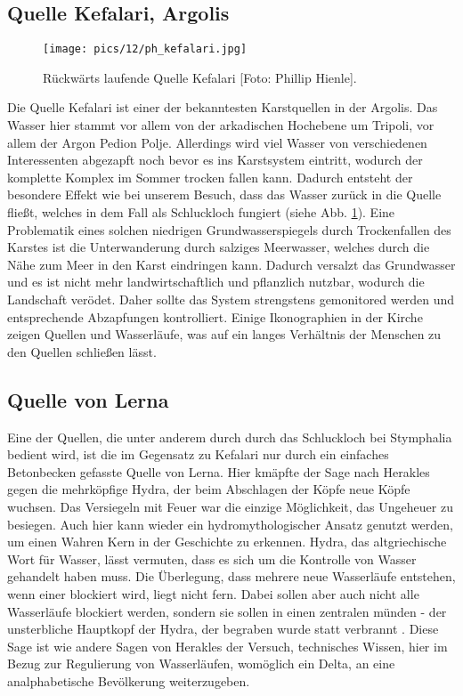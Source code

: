 \documentclass[preprint]{geomorphica} %
\begin{document}
\subsection{Quelle Kefalari, Argolis}

\begin{figure}[h]
    \centering
    \texttt{[image: pics/12/ph\_kefalari.jpg]}
    \caption{Rückwärts laufende Quelle Kefalari [Foto: Phillip Hienle].}
    \label{pic:kefalari}
\end{figure}

Die Quelle Kefalari ist einer der bekanntesten Karstquellen in der Argolis. Das Wasser hier stammt vor allem von der arkadischen Hochebene um Tripoli, vor allem der Argon Pedion Polje. Allerdings wird viel Wasser von verschiedenen Interessenten abgezapft noch bevor es ins Karstsystem eintritt, wodurch der komplette Komplex im Sommer trocken fallen kann. Dadurch entsteht der besondere Effekt wie bei unserem Besuch, dass das Wasser zurück in die Quelle fließt, welches in dem Fall als Schluckloch fungiert (siehe Abb. \ref{pic:kefalari}). Eine Problematik eines solchen niedrigen Grundwasserspiegels durch Trockenfallen des Karstes ist die Unterwanderung durch salziges Meerwasser, welches durch die Nähe zum Meer in den Karst eindringen kann. Dadurch versalzt das Grundwasser und es ist nicht mehr landwirtschaftlich und pflanzlich nutzbar, wodurch die Landschaft verödet. Daher sollte das System strengstens gemonitored werden und entsprechende Abzapfungen kontrolliert. Einige Ikonographien in der Kirche zeigen Quellen und Wasserläufe, was auf ein langes Verhältnis der Menschen zu den Quellen schließen lässt.

\subsection{Quelle von Lerna}

Eine der Quellen, die unter anderem durch durch das Schluckloch bei Stymphalia bedient wird, ist die im Gegensatz zu Kefalari nur durch ein einfaches Betonbecken gefasste Quelle von Lerna. Hier kmäpfte der Sage nach Herakles gegen die mehrköpfige Hydra, der beim Abschlagen der Köpfe neue Köpfe wuchsen. Das Versiegeln mit Feuer war die einzige Möglichkeit, das Ungeheuer zu besiegen. Auch hier kann wieder ein hydromythologischer Ansatz genutzt werden, um einen Wahren Kern in der Geschichte zu erkennen. Hydra, das altgriechische Wort für Wasser, lässt vermuten, dass es sich um die Kontrolle von Wasser gehandelt haben muss. Die Überlegung, dass mehrere neue Wasserläufe entstehen, wenn einer blockiert wird, liegt nicht fern. Dabei sollen aber auch nicht alle Wasserläufe blockiert werden, sondern sie sollen in einen zentralen münden - der unsterbliche Hauptkopf der Hydra, der begraben wurde statt verbrannt \cite{unkelHydraHermesHerkules2020}. Diese Sage ist wie andere Sagen von Herakles der Versuch, technisches Wissen, hier im Bezug zur Regulierung von Wasserläufen, womöglich ein Delta, an eine analphabetische Bevölkerung weiterzugeben.
\end{document}
